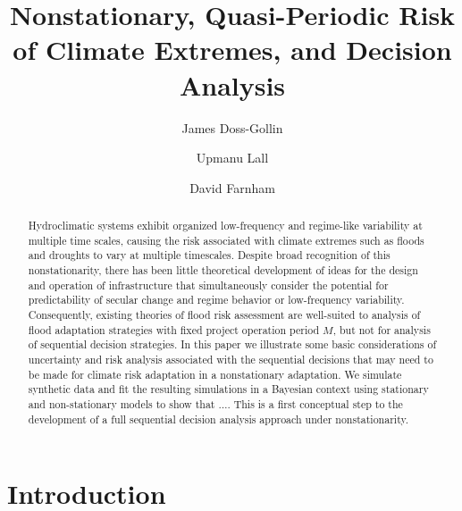\documentclass[11pt]{article}
\title{Nonstationary, Quasi-Periodic Risk of Climate Extremes, and Decision Analysis}
\author[1,2]{James Doss-Gollin}
\author[1,2]{Upmanu Lall}
\author[1,2]{David Farnham}
\affil[1]{Columbia Water Center, Columbia University}
\affil[2]{Department of Earth and Environmental Engineering, Columbia University}
\begin{document}
\maketitle
\RaggedRight{}
\begin{abstract}
  Hydroclimatic systems exhibit organized low-frequency and regime-like variability at multiple time scales, causing the risk associated with climate extremes such as floods and droughts to vary at multiple timescales.
  Despite broad recognition of this nonstationarity, there has been little theoretical development of ideas for the design and operation of infrastructure that simultaneously consider the potential for predictability of secular change and regime behavior or low-frequency variability.
  Consequently, existing theories of flood risk assessment are well-suited to analysis of flood adaptation strategies with fixed project operation period \(M\), but not for analysis of sequential decision strategies.
  In this paper we illustrate some basic considerations of uncertainty and risk analysis associated with the sequential decisions that may need to be made for climate risk adaptation in a nonstationary adaptation.
  We simulate synthetic data and fit the resulting simulations in a Bayesian context using stationary and non-stationary models to show that \(\ldots{}\).
  This is a first conceptual step to the development of a full sequential decision analysis approach under nonstationarity.
\end{abstract}


\section{Introduction}
\end{document}
